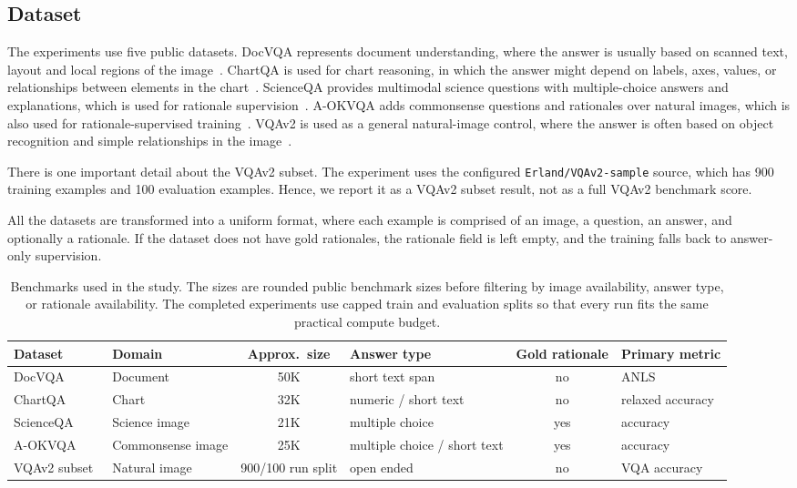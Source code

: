 \documentclass[preprint,12pt]{elsarticle}
\begin{document}
\subsection{Dataset}
The experiments use five public datasets.
DocVQA represents document understanding, where the answer is usually based on scanned text, layout and local regions of the image~\cite{mathew2021docvqa}.
ChartQA is used for chart reasoning, in which the answer might depend on labels, axes, values, or relationships between elements in the chart~\cite{masry2022chartqa}.
ScienceQA provides multimodal science questions with multiple-choice answers and explanations, which is used for rationale supervision~\cite{lu2022scienceqa}.
A-OKVQA adds commonsense questions and rationales over natural images, which is also used for rationale-supervised training~\cite{schwenk2022aokvqa}.
VQAv2 is used as a general natural-image control, where the answer is often based on object recognition and simple relationships in the image~\cite{goyal2017vqav2}.

There is one important detail about the VQAv2 subset.
The experiment uses the configured \texttt{Erland/VQAv2-sample} source, which has 900 training examples and 100 evaluation examples.
Hence, we report it as a VQAv2 subset result, not as a full VQAv2 benchmark score.

All the datasets are transformed into a uniform format, where each example is comprised of an image, a question, an answer, and optionally a rationale.
If the dataset does not have gold rationales, the rationale field is left empty, and the training falls back to answer-only supervision.


\begin{table}[!htbp]
\centering
\caption{Benchmarks used in the study. The sizes are rounded public benchmark sizes before filtering by image availability, answer type, or rationale availability. The completed experiments use capped train and evaluation splits so that every run fits the same practical compute budget.}
\label{tab:Datasets}
\begin{adjustbox}{max width=\textwidth}
\begin{tabular}{|l|l|c|l|c|l|}
\hline
\textbf{Dataset} & \textbf{Domain} & \textbf{Approx.\ size} & \textbf{Answer type} & \textbf{Gold rationale} & \textbf{Primary metric} \\ \hline
DocVQA~\cite{mathew2021docvqa} & Document & 50K & short text span & no & ANLS \\
ChartQA~\cite{masry2022chartqa} & Chart & 32K & numeric / short text & no & relaxed accuracy \\
ScienceQA~\cite{lu2022scienceqa} & Science image & 21K & multiple choice & yes & accuracy \\
A-OKVQA~\cite{schwenk2022aokvqa} & Commonsense image & 25K & multiple choice / short text & yes & accuracy \\
VQAv2 subset~\cite{goyal2017vqav2} & Natural image & 900/100 run split & open ended & no & VQA accuracy \\ \hline
\end{tabular}
\end{adjustbox}
\end{table}
\end{document}

